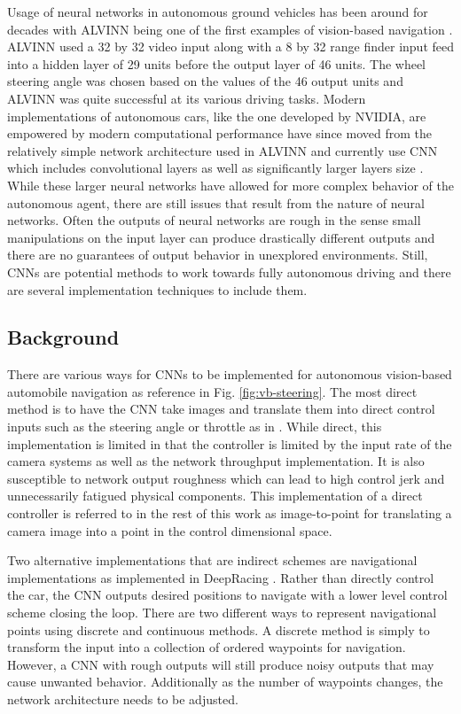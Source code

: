\documentclass[conference]{IEEEtran}
\begin{document}
Usage of neural networks in autonomous ground vehicles has been around for decades with ALVINN being one of the first examples of vision-based navigation \cite{pomerieau-1989}. ALVINN used a 32 by 32 video input along with a 8 by 32 range finder input feed into a hidden layer of 29 units before the output layer of 46 units. The wheel steering angle was chosen based on the values of the 46 output units and ALVINN was quite successful at its various driving tasks. Modern implementations of autonomous cars, like the one developed by NVIDIA, are empowered by modern computational performance have since moved from the relatively simple network architecture used in ALVINN and currently use CNN which includes convolutional layers as well as significantly larger layers size \cite{bojarski2016end}. While these larger neural networks have allowed for more complex behavior of the autonomous agent, there are still issues that result from the nature of neural networks. Often the outputs of neural networks are rough in the sense  small manipulations on the input layer can produce drastically different outputs and there are no guarantees of output behavior in unexplored environments. Still, CNNs are potential methods to work towards fully autonomous driving and there are several implementation techniques to include them.

\subsection{Background}

There are various ways for CNNs to be implemented for autonomous vision-based automobile navigation as reference in Fig. \ref{fig:vb-steering}. The most direct method is to have the CNN take images and translate them into direct control inputs such as the steering angle or throttle as in \cite{bechtel2018}. While direct, this implementation is limited in that the controller is limited by the input rate of the camera systems as well as the network throughput implementation. It is also susceptible to network output roughness which can lead to high control jerk and unnecessarily fatigued physical components. This implementation of a direct controller is referred to in the rest of this work as image-to-point for translating a camera image into a point in the control dimensional space.

Two alternative implementations that are indirect schemes are navigational implementations as implemented in DeepRacing \cite{trent2020iros}. Rather than directly control the car, the CNN outputs desired positions to navigate with a lower level control scheme closing the loop. There are two different ways to represent navigational points using discrete and continuous methods. A discrete method is simply to transform the input into a collection of ordered waypoints for navigation. However, a CNN with rough outputs will still produce noisy outputs that may cause unwanted behavior. Additionally as the number of waypoints changes, the network architecture needs to be adjusted.
\end{document}

